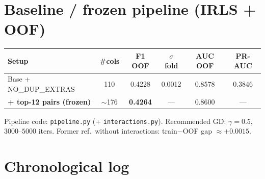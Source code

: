 \documentclass[11pt,a4paper]{article}
\begin{document}
\section{Baseline / frozen pipeline (IRLS + OOF)}
\begin{center}
\begin{tabular}{@{}lccccc@{}}
\toprule
Setup & \#cols & F1 OOF & $\sigma$ fold & AUC OOF & PR-AUC \\
\midrule
Base + NO\_DUP\_EXTRAS & 110 & 0.4228 & 0.0012 & 0.8578 & 0.3846 \\
\textbf{+ top-12 pairs (frozen)} & $\sim$176 & \textbf{0.4264} & --- & 0.8600 & --- \\
\bottomrule
\end{tabular}
\end{center}
\noindent Pipeline code: \texttt{pipeline.py} (+ \texttt{interactions.py}).
Recommended GD: $\gamma=0.5$, $3000$--$5000$ iters.
Former ref.\ without interactions: train$-$OOF gap $\approx +0.0015$.

\section{Chronological log}
\end{document}
